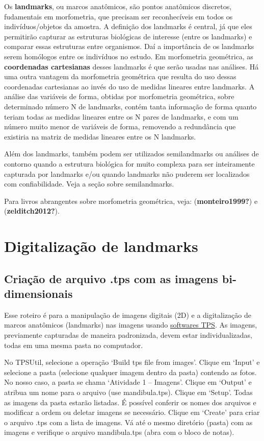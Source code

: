 \documentclass[
]{book}
\begin{document}
Os \textbf{landmarks}, ou marcos anatômicos, são pontos anatômicos discretos, fudamentais em morfometria, que precisam ser reconhecíveis em todos os indivíduos/objetos da amostra. A definição dos landmarks é central, já que eles permitirão capturar as estruturas biológicas de interesse (entre os landmarks) e comparar essas estruturas entre organismos. Daí a importância de os landmarks serem homólogos entre os indivíduos no estudo. Em morfometria geométrica, as \textbf{coordenadas cartesianas} desses landmarks é que serão usadas nas análises. Há uma outra vantagem da morfometria geométrica que resulta do uso dessas coordenadas cartesianas ao invés do uso de medidas lineares entre landmarks. A análise das variáveis de forma, obtidas por morfometria geométrica, sobre determinado número N de landmarks, contém tanta informação de forma quanto teriam todas as medidas lineares entre os N pares de landmarks, e com um número muito menor de variáveis de forma, removendo a redundância que existiria na matriz de medidas lineares entre os N landmarks.

Além dos landmarks, também podem ser utilizados semilandmarks ou análises de contorno quando a estrutura biológica for muito complexa para ser inteiramente capturada por landmarks e/ou quando landmarks não puderem ser localizados com confiabilidade. Veja a seção sobre semilandmarks.

Para livros abrangentes sobre morfometria geométrica, veja: (\textbf{monteiro1999?}) e (\textbf{zelditch2012?}).

\chapter{Digitalização de landmarks}\label{digitalizauxe7uxe3o-de-landmarks}

\section{Criação de arquivo .tps com as imagens bi-dimensionais}\label{criauxe7uxe3o-de-arquivo-.tps-com-as-imagens-bi-dimensionais}

Esse roteiro é para a manipulação de imagens digitais (2D) e a digitalização de marcos anatômicos (landmarks) nas imagens usando \href{https://www.sbmorphometrics.org/}{softwares TPS}. As imagens, previamente capturadas de maneira padronizada, devem estar individualizadas, todas em uma mesma pasta no computador.

No TPSUtil, selecione a operação `Build tps file from images'. Clique em `Input' e selecione a pasta (selecione qualquer imagem dentro da pasta) contendo as fotos. No nosso caso, a pasta se chama `Atividade 1 -- Imagens'. Clique em `Output' e atribua um nome para o arquivo (use mandibula.tps). Clique em `Setup'. Todas as imagens da pasta estarão listadas. É possível conferir os nomes dos arquivos e modificar a ordem ou deletar imagens se necessário. Clique em `Create' para criar o arquivo .tps com a lista de imagens. Vá até o mesmo diretório (pasta) com as imagens e verifique o arquivo mandibula.tps (abra com o bloco de notas).
\end{document}
